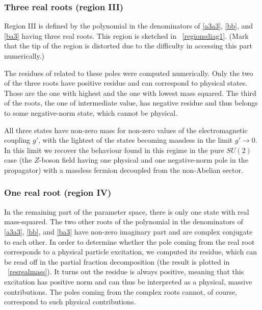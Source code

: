 \subsubsection{Three real roots (region III)}




Region III is defined by the polynomial in the denominators of \eqref{a3a3}, \eqref{bb}, and \eqref{ba3} having three real roots. This region is sketched in \figurename\ \ref{regionsdiag1}. (Mark that the tip of the region is distorted due to the difficulty in accessing this part numerically.) 


The residues of related to these poles were computed numerically. Only the two of the three roots have positive residue and can correspond to physical states. Those are the one with highest and the one with lowest mass squared. The third of the roots, the one of intermediate value, has negative residue and thus belongs to some negative-norm state, which cannot be physical.

All three states have non-zero mass for non-zero values of the electromagnetic coupling $g'$, with the lightest of the states becoming massless in the limit $g'\to0$. In this limit we recover the behaviour found in this regime in the pure $SU(2)$ case \cite{Capri:2012cr} (the $Z$-boson field having one physical and one negative-norm pole in the propagator) with a massless fermion decoupled from the non-Abelian sector.






\subsubsection{One real root (region IV)}
In the remaining part of the parameter space, there is only one state with real mass-squared.
The two other roots of the polynomial in the denominators of \eqref{a3a3}, \eqref{bb}, and
\eqref{ba3} have non-zero imaginary part and are complex conjugate to each other. In order to
determine whether the pole coming from the real root corresponds to a physical particle
excitation, we computed its residue, which can be read off in the partial fraction
decomposition (the result is plotted in \figurename\ \ref{resrealmass}). It turns out the
residue is always positive, meaning that this excitation has positive norm and can thus be
interpreted as a physical, massive contributions. The poles coming from the complex roots
cannot, of course, correspond to such physical contributions.

